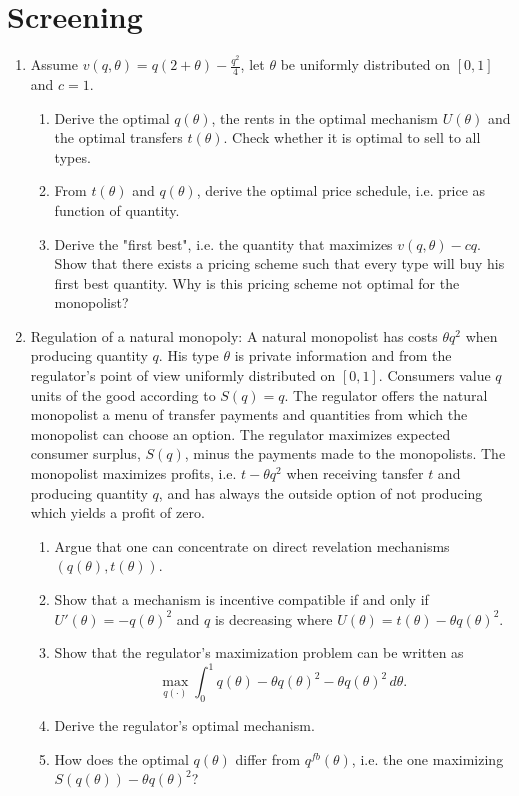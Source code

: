 \documentclass[a4paper,12pt]{article}
\begin{document}
\section{Screening}
\label{sec:screening}

\begin{enumerate}
\item Assume $v(q,\theta)=q(2+\theta)-\frac{q^{2}}{4}$, let $\theta$ be uniformly distributed on $[0,1]$ and $c=1$.
  \begin{enumerate}
  \item Derive the optimal $q(\theta)$, the rents in the optimal
    mechanism $U(\theta)$ and the optimal transfers $t(\theta)$. Check
    whether it is optimal to sell to all types.
   \item From $t(\theta)$ and $q(\theta)$, derive the optimal price schedule, i.e. price as function of quantity.
   \item Derive the "first best", i.e. the quantity that maximizes
    $v(q,\theta)-c q$. Show that there exists a pricing scheme such that
    every type will buy his first best quantity. Why is this pricing
    scheme not optimal for the monopolist?
\end{enumerate}
\item Regulation of a natural monopoly: A natural monopolist has costs $\theta q^2$ when producing quantity $q$. His type $\theta $ is private information and from the regulator's point of view uniformly distributed on $[0,1]$. Consumers value $q$ units of the good according to $S(q)=q$. The regulator offers the natural monopolist a menu of transfer payments and quantities from which the monopolist can choose an option. The regulator maximizes expected consumer surplus, $S(q)$, minus the payments made to the monopolists. The monopolist maximizes profits, i.e. $t-\theta  q^2$ when receiving tansfer $t$ and producing quantity $q$, and has always the outside option of not producing which yields a profit of zero.
  \begin{enumerate}
  \item Argue that one can concentrate on direct revelation mechanisms $(q(\theta ),t(\theta ))$.
  \item Show that a mechanism is incentive compatible if and only if $U'(\theta )=-q(\theta )^2$ and $q$ is decreasing where $U(\theta )=t(\theta )-\theta q(\theta )^2$.
  \item Show that the regulator's maximization problem can be written as $$\max_{q(\cdot)}\int_0^1 q(\theta )-\theta q(\theta )^2-\theta q(\theta )^2\,d\theta. $$
  \item Derive the regulator's optimal mechanism.
    \item How does the optimal $q(\theta )$ differ from $q^{fb}(\theta )$, i.e. the one maximizing $S(q(\theta ))-\theta q(\theta )^2$? 
  \end{enumerate}
\end{enumerate}
\end{document}
